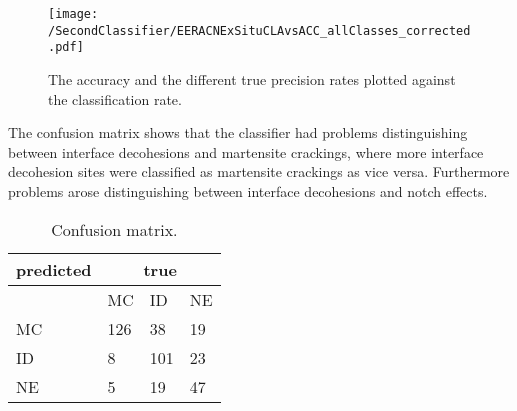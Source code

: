 \begin{figure}[H]
\centering
\texttt{[image: /SecondClassifier/EERACNExSituCLAvsACC\_allClasses\_corrected.pdf]}
\caption{The accuracy and the different true precision rates plotted against the classification rate.}
\label{fig:EERACNExSituCLAvsACC_allClasses}
\end{figure}
The confusion matrix shows that the classifier had problems distinguishing between interface decohesions and martensite crackings, where more interface decohesion sites were classified as martensite crackings as vice versa. Furthermore problems arose distinguishing between interface decohesions and notch effects. \\

\begin{table}[H]
 \begin{center}
  \begin{tabular}{@{} *4l @{}} \toprule[2pt]
   predicted &  \multicolumn{3}{c}{true}  \\\midrule
    & MC  & ID & NE   \\ 
   MC  & 126 & 38 & 19 \\ 
   ID  & 8 & 101 & 23 \\ 
   NE  & 5 & 19 & 47 \\ \bottomrule[2pt]
  \end{tabular}
 \end{center}
 \caption{Confusion matrix.}
   \label{tab:SecondClassifierConfusionMatrixExSitu}
\end{table}


